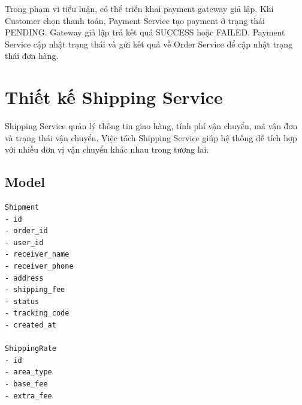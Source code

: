 \documentclass[../main.tex]{subfiles}
\begin{document}
Trong phạm vi tiểu luận, có thể triển khai payment gateway giả lập. Khi Customer chọn thanh toán, Payment Service tạo payment ở trạng thái PENDING. Gateway giả lập trả kết quả SUCCESS hoặc FAILED. Payment Service cập nhật trạng thái và gửi kết quả về Order Service để cập nhật trạng thái đơn hàng.

\section{Thiết kế Shipping Service}
\label{section:2.8}

Shipping Service quản lý thông tin giao hàng, tính phí vận chuyển, mã vận đơn và trạng thái vận chuyển. Việc tách Shipping Service giúp hệ thống dễ tích hợp với nhiều đơn vị vận chuyển khác nhau trong tương lai.

\subsection{Model}
\label{subsection:2.8.1}

\begin{lstlisting}[caption={Model tổng quát của Shipping Service}, label={lst:chapter2-shipping-model}]
Shipment
- id
- order_id
- user_id
- receiver_name
- receiver_phone
- address
- shipping_fee
- status
- tracking_code
- created_at

ShippingRate
- id
- area_type
- base_fee
- extra_fee
\end{lstlisting}
\end{document}
